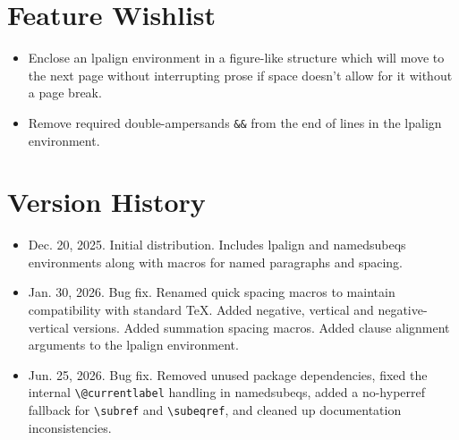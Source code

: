 \documentclass{article}
\begin{document}
\section{Feature Wishlist}
\begin{itemize}
	\item[$\boxdot$] Enclose an \textsf{lpalign} environment in a figure-like structure which will move to the next page without interrupting prose if space doesn't allow for it without a page break. 
	\item[$\boxdot$] Remove required double-ampersands \verb|&&| from the end of lines in the \textsf{lpalign} environment.
\end{itemize}




\section{Version History}
	\begin{itemize}
	\item[v1.0] Dec. 20, 2025. Initial distribution. Includes \textsf{lpalign} and \textsf{namedsubeqs} environments along with macros for named paragraphs and spacing.
	\item[v1.1] Jan. 30, 2026. Bug fix. Renamed quick spacing macros to maintain compatibility with standard \TeX. Added negative, vertical and negative-vertical versions. Added summation spacing macros. Added clause alignment arguments to the \textsf{lpalign} environment.
	\item[v1.2] Jun. 25, 2026. Bug fix. Removed unused package dependencies, fixed the internal \verb|\@currentlabel| handling in \textsf{namedsubeqs}, added a no-\textsf{hyperref} fallback for \verb|\subref| and \verb|\subeqref|, and cleaned up documentation inconsistencies.
	\end{itemize}
\end{document}
